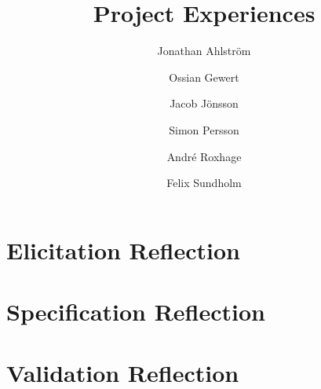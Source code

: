 \documentclass[a4paper]{article}
\title{Project Experiences}
\author{Jonathan Ahlström \and Ossian Gewert \and Jacob Jönsson \and Simon Persson \and André Roxhage \and Felix Sundholm}
\begin{document}
\maketitle

\begin{center}
    
\end{center}

\tableofcontents

\newpage


\section{Elicitation Reflection}



\section{Specification Reflection}


\section{Validation Reflection}

\end{document}
